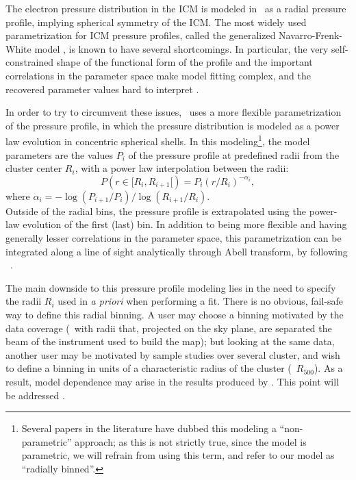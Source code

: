 The electron pressure distribution in the ICM is modeled in \panco\ as a radial pressure profile, implying spherical symmetry of the ICM.
The most widely used parametrization for ICM pressure profiles, called the generalized Navarro-Frenk-White model \citep[gNFW,][]{zhao_analytical_1996, nagai_effects_2007}, is known to have several shortcomings.
In particular, the very self-constrained shape of the functional form of the profile and the important correlations in the parameter space make model fitting complex, and the recovered parameter values hard to interpret \citep[see \eg][]{nagai_effects_2007, battaglia_cluster_2012-1, sayers_evolution_2022}.

In order to try to circumvent these issues, \panco\ uses a more flexible parametrization of the pressure profile, in which the pressure distribution is modeled as a power law evolution in concentric spherical shells.
In this modeling\footnote{Several papers in the literature have dubbed this modeling a ``non-parametric'' approach; as this is not strictly true, since the model is parametric, we will refrain from using this term, and refer to our model as ``radially binned''.}, the model parameters are the values $P_i$ of the pressure profile at predefined radii from the cluster center $R_i$, with a power law interpolation between the radii:
\begin{equation}
    \label{eq:algo:pressure_profile}
    P(r \in [R_i, R_{i+1}[) = P_i \left(r / R_i\right)^{-\alpha_i},
\end{equation}
where $\alpha_i = - \log(P_{i+1} / P_i) / \log(R_{i+1} / R_i)$. \\
Outside of the radial bins, the pressure profile is extrapolated using the power-law evolution of the first (last) bin.
In addition to being more flexible and having generally lesser correlations in the parameter space, this parametrization can be integrated along a line of sight analytically through Abell transform, by following \eg\ \citet{romero_multi-instrument_2018}.

The main downside to this pressure profile modeling lies in the need to specify the radii $R_i$ used in  \textit{a priori} when performing a fit.
There is no obvious, fail-safe way to define this radial binning.
A user may choose a binning motivated by the data coverage (\eg\ with radii that, projected on the sky plane, are separated the beam of the instrument used to build the map); but looking at the same data, another user may be motivated by sample studies over several cluster, and wish to define a binning in units of a characteristic radius of the cluster (\eg\ $R_{500}$).
As a result, model dependence may arise in the results produced by \panco.
This point will be addressed .

